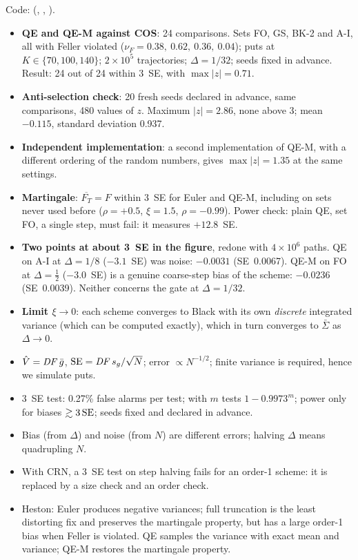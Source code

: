 \begin{progetto}[title={In the qpricer project: Heston Monte Carlo checks}]
Code:  (, , ).
\begin{itemize}
\item \textbf{QE and QE-M against COS}: 24 comparisons. Sets FO, GS, BK-2 and A-I, all with Feller violated
($\nu_F=0.38,\ 0.62,\ 0.36,\ 0.04$); puts at $K\in\{70,100,140\}$; ${2\times10^5}$ trajectories; $\Delta=1/32$; seeds
fixed in advance. Result: 24 out of 24 within 3~SE, with $\max|z|=0.71$.
\item \textbf{Anti-selection check}: 20 fresh seeds declared in advance, same comparisons, 480 values of $z$. Maximum
$|z|=2.86$, none above 3; mean $-0.115$, standard deviation 0.937.
\item \textbf{Independent implementation}: a second implementation of QE-M, with a different ordering of the random
numbers, gives $\max|z|=1.35$ at the same settings.
\item \textbf{Martingale}: $\overline{F_T}=F$ within 3~SE for Euler and QE-M, including on sets never used before
($\rho=+0.5$, $\xi=1.5$, $\rho=-0.99$). Power check: plain QE, set FO, a single step, must fail: it measures
$+12.8$~SE.
\item \textbf{Two points at about 3~SE in the figure}, redone with ${4\times10^6}$ paths. QE on A-I at $\Delta=1/8$
($-3.1$~SE) was noise: $-0.0031$ (SE~0.0067). QE-M on FO at $\Delta=\tfrac12$ ($-3.0$~SE) is a genuine coarse-step
bias of the scheme: $-0.0236$ (SE~0.0039). Neither concerns the gate at $\Delta=1/32$.
\item \textbf{Limit $\xi\to0$}: each scheme converges to Black with its own \emph{discrete} integrated variance (which
can be computed exactly), which in turn converges to $\bar\Sigma$ as $\Delta\to0$.
\end{itemize}
\end{progetto}

\begin{riassunto}
\begin{itemize}
\item $\hat V=\mathit{DF}\,\bar g$, $\mathrm{SE}=\mathit{DF}\,s_g/\sqrt N$; error $\propto N^{-1/2}$; finite variance is required, hence we
simulate puts.
\item 3~SE test: 0.27\% false alarms per test; with $m$ tests $1-0.9973^m$; power only for biases $\gtrsim3\,\mathrm{SE}$;
seeds fixed and declared in advance.
\item Bias (from $\Delta$) and noise (from $N$) are different errors; halving $\Delta$ means quadrupling $N$.
\item With CRN, a 3~SE test on step halving fails for an order-1 scheme: it is replaced by a size check and an order
check.
\item Heston: Euler produces negative variances; full truncation is the least distorting fix and preserves the
martingale property, but has a large order-1 bias when Feller is violated. QE samples the variance with exact mean and
variance; QE-M restores the martingale property.
\end{itemize}
\end{riassunto}

